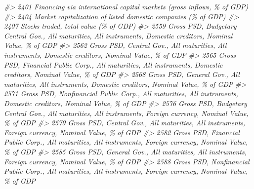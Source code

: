 \documentclass[
]{bxjsbook}
\newenvironment{Shaded}{\begin{snugshade}}{\end{snugshade}}
\newcommand{\CommentTok}[1]{\textcolor[rgb]{0.56,0.35,0.01}{\textit{#1}}}
\theoremstyle{definition}
\theoremstyle{definition}
\theoremstyle{definition}
\theoremstyle{definition}
\theoremstyle{remark}
\begin{document}
\begin{Shaded}
\begin{Highlighting}[]
\CommentTok{\#\textgreater{} 2401                                                                                                      Financing via international capital markets (gross inflows, \% of GDP)}
\CommentTok{\#\textgreater{} 2404                                                                                                              Market capitalization of listed domestic companies (\% of GDP)}
\CommentTok{\#\textgreater{} 2407                                                                                                                                      Stocks traded, total value (\% of GDP)}
\CommentTok{\#\textgreater{} 2559                                                            Gross PSD, Budgetary Central Gov., All maturities, All instruments, Domestic creditors, Nominal Value, \% of GDP}
\CommentTok{\#\textgreater{} 2562                                                                      Gross PSD, Central Gov., All maturities, All instruments, Domestic creditors, Nominal Value, \% of GDP}
\CommentTok{\#\textgreater{} 2565                                                            Gross PSD, Financial Public Corp., All maturities, All instruments, Domestic creditors, Nominal Value, \% of GDP}
\CommentTok{\#\textgreater{} 2568                                                                      Gross PSD, General Gov., All maturities, All instruments, Domestic creditors, Nominal Value, \% of GDP}
\CommentTok{\#\textgreater{} 2571                                                         Gross PSD, Nonfinancial Public Corp., All maturities, All instruments, Domestic creditors, Nominal Value, \% of GDP}
\CommentTok{\#\textgreater{} 2576                                                              Gross PSD, Budgetary Central Gov., All maturities, All instruments, Foreign currency, Nominal Value, \% of GDP}
\CommentTok{\#\textgreater{} 2579                                                                        Gross PSD, Central Gov., All maturities, All instruments, Foreign currency, Nominal Value, \% of GDP}
\CommentTok{\#\textgreater{} 2582                                                              Gross PSD, Financial Public Corp., All maturities, All instruments, Foreign currency, Nominal Value, \% of GDP}
\CommentTok{\#\textgreater{} 2585                                                                        Gross PSD, General Gov., All maturities, All instruments, Foreign currency, Nominal Value, \% of GDP}
\CommentTok{\#\textgreater{} 2588                                                           Gross PSD, Nonfinancial Public Corp., All maturities, All instruments, Foreign currency, Nominal Value, \% of GDP}

\end{Highlighting}
\end{Shaded}
\end{document}
